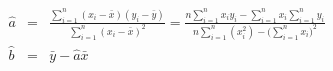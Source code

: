 \documentclass{article}
\begin{document}
\pagestyle{empty}
\begin{eqnarray*}
\hat{a} &=& \frac{\sum_{i=1}^{n}(x_i-\bar{x})(y_i-\bar{y})}{\sum_{i=1}^{n}(x_i-\bar{x})^2}
=\frac{n\sum_{i=1}^{n}x_i y_i - \sum_{i=1}^{n}x_i \sum_{i=1}^{n}y_i} 
{n\sum_{i=1}^{n}\left(x_i^2\right) - \big(\sum_{i=1}^{n}x_i\big)^2}\\
\hat{b} &=& \bar{y} - \hat{a}\bar{x}
\end{eqnarray*}
\end{document}
